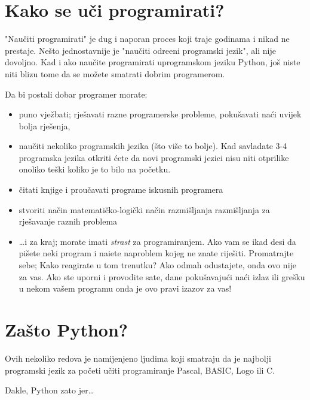 \section*{Kako se u\v{c}i programirati?}

	"Nau\v{c}iti programirati" je dug i naporan proces koji traje godinama i nikad ne
	prestaje. Ne\v{s}to jednostavnije je "nau\v{c}iti odre\dj{}eni programski jezik",
	ali nije dovoljno. Kad i ako nau\v{c}ite programirati uprogramskom jeziku Python,
	jo\v{s} niste niti blizu tome da se mo\v{z}ete smatrati dobrim programerom.

	Da bi postali dobar programer morate:
	\begin{itemize}
		\item puno vje\v{z}bati; rje\v{s}avati razne programerske probleme, 
			poku\v{s}avati na\'{c}i uvijek bolja rje\v{s}enja,
		\item nau\v{c}iti nekoliko programskih jezika (\v{s}to vi\v{s}e to bolje). 
			Kad savladate 3-4 programska jezika otkriti \'{c}ete da novi programski
			jezici nisu niti otprilike onoliko te\v{s}ki koliko je to bilo na
			po\v{c}etku.
		\item \v{c}itati knjige i prou\v{c}avati programe iskusnih programera
		\item stvoriti na\v{c}in matemati\v{c}ko-logi\v{c}ki na\v{c}in razmi\v{s}ljanja
			razmi\v{s}ljanja za rje\v{s}avanje raznih problema
		\item \dots i za kraj; morate imati \emph{strast} za programiranjem. Ako vam se
			ikad desi da pi\v{s}ete neki program i nai\dj{}ete naproblem kojeg ne znate
			rije\v{s}iti. Promatrajte sebe; Kako reagirate u tom trenutku? Ako odmah
			odustajete, onda ovo nije za vas. Ako ste uporni i provodite sate, dane 
			poku\v{s}avaju\'{c}i na\'{c}i izlaz ili gre\v{s}ku u nekom va\v{s}em programu
			onda je ovo pravi izazov za vas!
	\end{itemize}

\section*{Za\v{s}to Python?}

	Ovih nekoliko redova je namijenjeno ljudima koji smatraju da je najbolji programski
	jezik za po\v{c}eti u\v{c}iti programiranje Pascal, BASIC, Logo ili C.

	Dakle, Python zato jer\dots

